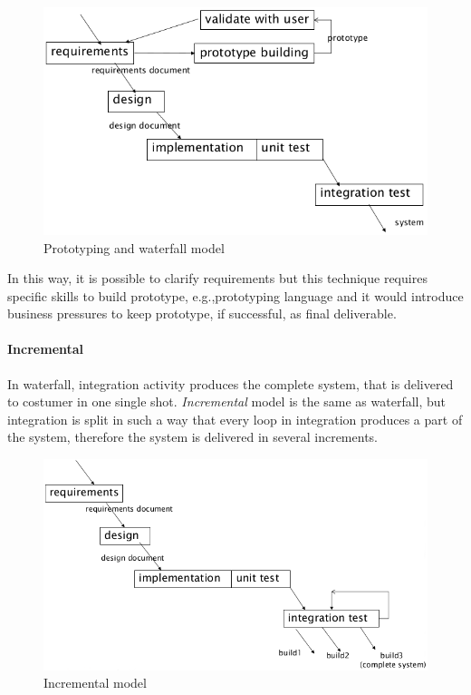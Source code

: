 \begin{figure}[hbtp]
\centering
\includegraphics[scale=0.3]{images/prototyping_model.png}
\caption{Prototyping and waterfall model}
\end{figure}

In this way, it is possible to clarify requirements but this technique requires specific skills to build prototype, e.g.,\@ prototyping language and it would introduce business pressures to keep prototype, if successful, as final deliverable.

\paragraph{Incremental}
In waterfall, integration activity produces the complete system, that is delivered to costumer in one single shot. \emph{Incremental} model is the same as waterfall, but integration is split in such a way that every loop in integration produces a part of the system, therefore the system is delivered in several increments.

\begin{figure}[hbtp]
\centering
\includegraphics[scale=0.3]{images/incremental_model.png}
\caption{Incremental model}
\end{figure}

